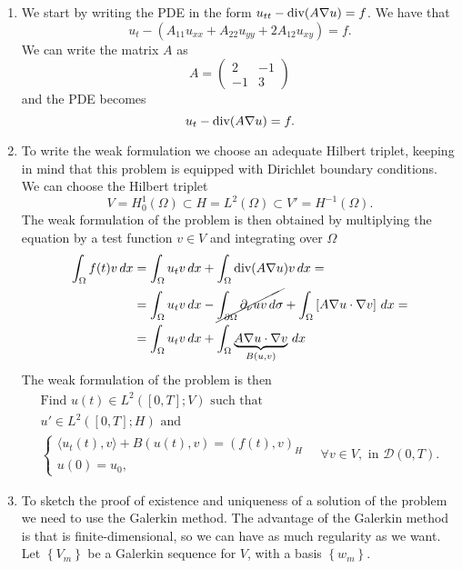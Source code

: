 \begin{enumerate}
    \item We start by writing the PDE in the form \(u_{tt} - \text{div}(A \nabla u) = f\). We have that
    \[
        u_{t} - \left(A_{11} u_{xx} + A_{22} u_{yy} + 2A_{12} u_{xy}\right) = f.
    \]
    We can write the matrix \(A\) as
    \[
        A = \begin{pmatrix}
            2 & -1 \\
            -1 & 3
        \end{pmatrix}
    \]
    and the PDE becomes
    \[
        u_{t} - \text{div} (A \nabla u) = f.
    \]
    \item To write the weak formulation we choose an adequate Hilbert triplet, keeping in mind that this problem is equipped with Dirichlet boundary conditions. We can choose the Hilbert triplet
    \[
        V = H^1_0(\Omega) \subset H = L^2(\Omega) \subset V' = H^{-1}(\Omega).
    \]
    The weak formulation of the problem is then obtained by multiplying the equation by a test function \(v \in V\) and integrating over \(\Omega\)
    \begin{align*}
        \int_\Omega f(t) v \, dx &= \int_\Omega u_{t} v \, dx + \int_\Omega \text{div}(A \nabla u)v \, dx =\\
        &= \int_\Omega u_{t} v \, dx - \cancel{\int_{\partial\Omega} \partial_\nu u v \, d\sigma} + \int_\Omega \left[A \nabla u \cdot \nabla v\right] \, dx = \\
        &= \int_\Omega u_{t} v \, dx + \int_\Omega \underbrace{A \nabla u \cdot \nabla v}_{B(u, v)} \, dx
    \end{align*}
    The weak formulation of the problem is then
    \[
        \begin{split}
            \text{Find } u(t) \in L^2([0, T]; V) \text{ such that } \\
            u' \in L^2([0, T];H)\text{ and } \\
            \begin{cases}
                \langle u_{t}(t), v \rangle + B(u(t), v) = (f(t), v)_H \\
                u(0) = u_0,
            \end{cases}\quad \forall v \in V, \text{ in } \mathcal{D}(0, T).
        \end{split}
    \]
    \item To sketch the proof of existence and uniqueness of a solution of the problem we need to use the Galerkin method. The advantage of the Galerkin method is that is finite-dimensional, so we can have as much regularity as we want. Let \(\left\{V_m\right\}\) be a Galerkin sequence for \(V\), with a basis \(\left\{w_m \right\}\).

\end{enumerate}
